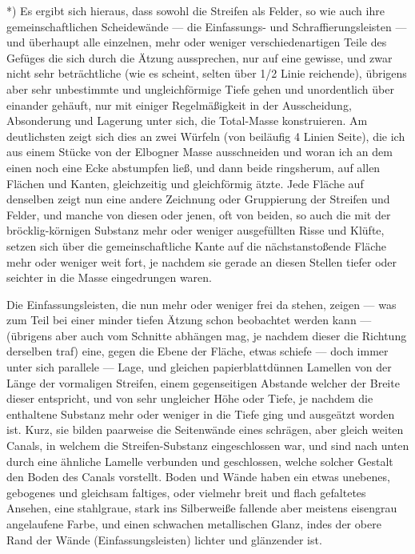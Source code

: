 \documentclass[a4paper, 11pt, oneside, german]{article}
\begin{document}
*) Es ergibt sich hieraus, dass sowohl die Streifen als Felder, so wie auch ihre gemeinschaftlichen Scheidewände --- die Einfassungs- und Schraffierungsleisten --- und überhaupt alle einzelnen, mehr oder weniger verschiedenartigen Teile des Gefüges die sich durch die Ätzung aussprechen, nur auf eine gewisse, und zwar nicht sehr beträchtliche (wie es scheint, selten über 1/2 Linie reichende), übrigens aber sehr unbestimmte und ungleichförmige Tiefe gehen und unordentlich über einander gehäuft, nur mit einiger Regelmäßigkeit in der Ausscheidung, Absonderung und Lagerung unter sich, die Total-Masse konstruieren. Am deutlichsten zeigt sich dies an zwei Würfeln (von beiläufig 4 Linien Seite), die ich aus einem Stücke von der Elbogner Masse ausschneiden und woran ich an dem einen noch eine Ecke abstumpfen ließ, und dann beide ringsherum, auf allen Flächen und Kanten, gleichzeitig und gleichförmig ätzte. Jede Fläche auf denselben zeigt nun eine andere Zeichnung oder Gruppierung der Streifen und Felder, und manche von diesen oder jenen, oft von beiden, so auch die mit der bröcklig-körnigen Substanz mehr oder weniger ausgefüllten Risse und Klüfte, setzen sich über die gemeinschaftliche Kante auf die nächstanstoßende Fläche mehr oder weniger weit fort, je nachdem sie gerade an diesen Stellen tiefer oder seichter in die Masse eingedrungen waren.

Die Einfassungsleisten, die nun mehr oder weniger frei da stehen, zeigen --- was zum Teil bei einer minder tiefen Ätzung schon beobachtet werden kann --- (übrigens aber auch vom Schnitte abhängen mag, je nachdem dieser die Richtung derselben traf) eine, gegen die Ebene der Fläche, etwas schiefe --- doch immer unter sich parallele --- Lage, und gleichen papierblattdünnen Lamellen von der Länge der vormaligen Streifen, einem gegenseitigen Abstande welcher der Breite dieser entspricht, und von sehr ungleicher Höhe oder Tiefe, je nachdem die enthaltene Substanz mehr oder weniger in die Tiefe ging und ausgeätzt worden ist. Kurz, sie bilden paarweise die Seitenwände eines schrägen, aber gleich weiten Canals, in welchem die Streifen-Substanz eingeschlossen war, und sind nach unten durch eine ähnliche Lamelle verbunden und geschlossen, welche solcher Gestalt den Boden des Canals vorstellt. Boden und Wände haben ein etwas unebenes, gebogenes und gleichsam faltiges, oder vielmehr breit und flach gefaltetes Ansehen, eine stahlgraue, stark ins Silberweiße fallende aber meistens eisengrau angelaufene Farbe, und einen schwachen metallischen Glanz, indes der obere Rand der Wände (Einfassungsleisten) lichter und glänzender ist.
\end{document}
